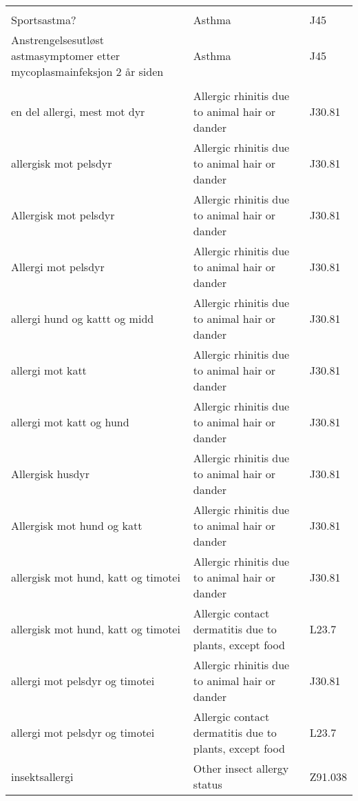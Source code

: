 \begin{table}[H]
{\begin{tabular}{|lll|}
        \rowcolor[HTML]{FFD1AA}        
		\multicolumn{3}{|l|}{Respiratory system}   \\
		\hline   		

        \rowcolor[HTML]{88CC88}        
		\multicolumn{3}{|l|}{Asthma cases}   \\
		\hline   		
        
		Sportsastma?                                                             & Asthma & J45 \\		
    	Anstrengelsesutløst astmasymptomer etter mycoplasmainfeksjon 2 år siden  & Asthma & J45 \\				

		\hline
        
        \rowcolor[HTML]{88CC88}        
		\multicolumn{3}{|l|}{Allergies to plants and animals}   \\
		\hline   		
         
		en del allergi, mest mot dyr        & Allergic rhinitis due to animal hair or dander         & J30.81 \\		
		allergisk mot pelsdyr               & Allergic rhinitis due to animal hair or dander         & J30.81 \\				
		Allergisk mot pelsdyr               & Allergic rhinitis due to animal hair or dander         & J30.81 \\		
		Allergi mot pelsdyr                 & Allergic rhinitis due to animal hair or dander         & J30.81 \\		
		allergi hund og kattt og midd       & Allergic rhinitis due to animal hair or dander         & J30.81 \\		
		allergi mot katt                    & Allergic rhinitis due to animal hair or dander         & J30.81 \\		
		allergi mot katt og hund            & Allergic rhinitis due to animal hair or dander         & J30.81 \\		
		Allergisk husdyr                    & Allergic rhinitis due to animal hair or dander         & J30.81 \\								
		Allergisk mot hund og katt          & Allergic rhinitis due to animal hair or dander         & J30.81 \\	
		allergisk mot hund, katt og timotei & Allergic rhinitis due to animal hair or dander         & J30.81 \\								
		allergisk mot hund, katt og timotei & Allergic contact dermatitis due to plants, except food & L23.7 \\								
		allergi mot pelsdyr og timotei      & Allergic rhinitis due to animal hair or dander         & J30.81 \\								
		allergi mot pelsdyr og timotei      & Allergic contact dermatitis due to plants, except food & L23.7 \\						
		insektsallergi                      & Other insect allergy status                            & Z91.038 \\	
		

\end{tabular}}
\end{table}
